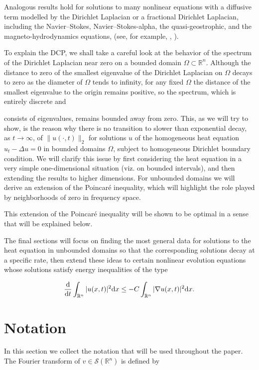 \documentclass{amsart}
\numberwithin{Theorem}{section}
\numberwithin{equation}{section}
\theoremstyle{definition}
\theoremstyle{remark}
\begin{document}
Analogous results hold for solutions to many nonlinear equations with a diffusive term modelled by the Dirichlet Laplacian or a fractional Dirichlet Laplacian, including the Navier--Stokes, Navier--Stokes-alpha, the quasi-geostrophic, and the magneto-hydrodynamics equations, (see, for example, \cite{CS}, \cite{MR837929}).

To explain the DCP, we shall take a careful look at the behavior of the spectrum of the Dirichlet Laplacian near zero on a bounded domain $\Omega\subset \mathbb{R}^n$. Although the distance to zero of the smallest eigenvalue of the Dirichlet Laplacian on $\Omega$ decays to zero as the diameter of $\Omega$ tends to infinity, for any fixed $\Omega$ the distance of the smallest eigenvalue to the origin remains positive, so the spectrum, which is entirely discrete and

consists of eigenvalues, remains bounded away from zero. This, as we will try to show, is the reason why there is no transition to slower than exponential decay, as $t \rightarrow \infty$, of $\|u(\cdot,t)\|_2$ for solutions $u$ of the homogeneous heat equation $u_t - \Delta u = 0$ in bounded domains $\Omega$, subject to homogeneous Dirichlet boundary condition.  We will clarify this issue by first considering the heat equation in a very simple one-dimensional situation (viz. on bounded intervals), and then extending the results to higher dimensions. For unbounded domains we will derive an extension of the Poincar\'{e} inequality, which will highlight the role played by neighborhoods of zero in frequency space.

This extension of the Poincar\'e inequality will be shown to be optimal in a sense that will be explained below.

The final sections will focus on finding the most general data for solutions to the heat equation in unbounded domains so that the corresponding solutions decay at a specific rate, then extend these ideas to certain nonlinear evolution equations whose solutions satisfy energy inequalities of the type

\[ \frac{{\rm d}}{{\rm d}t} \int _{{\mathbb R}^n} |u(x,t)|^2 {\rm d}x \leq -C  \int _{{\mathbb R}^n} |\nabla u(x,t)|^2 {\rm d}x. \]

\section{Notation}

In this section we collect the notation that will be used throughout the paper. The Fourier transform of $v\in \mathcal{S}({{\mathbb R}^n})$ is defined by
\end{document}
